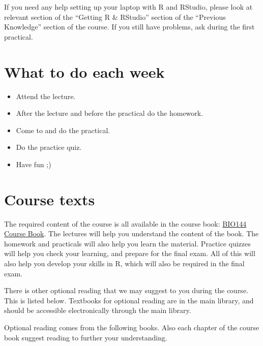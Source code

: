 \documentclass[
  letterpaper,
  8pt,
  a4paper]{book}
\begin{document}
If you need any help setting up your laptop with R and RStudio, please
look at relevant section of the ``Getting R \& RStudio'' section of the
``Previous Knowledge'' section of the course. If you still have
problems, ask during the first practical.

\section*{What to do each week}\label{what-to-do-each-week}


\begin{itemize}
\item
  Attend the lecture.
\item
  After the lecture and before the practical do the homework.
\item
  Come to and do the practical.
\item
  Do the practice quiz.
\item
  Have fun ;)
\end{itemize}

\section*{Course texts}\label{course-texts}


The required content of the course is all available in the course book:
\href{https://opetchey.github.io/BIO144_Course_Book/}{BIO144 Course
Book}. The lectures will help you understand the content of the book.
The homework and practicals will also help you learn the material.
Practice quizzes will help you check your learning, and prepare for the
final exam. All of this will also help you develop your skills in R,
which will also be required in the final exam.

There is other optional reading that we may suggest to you during the
course. This is listed below. Textbooks for optional reading are in the
main library, and should be accessible electronically through the main
library.

Optional reading comes from the following books. Also each chapter of
the course book suggest reading to further your understanding.
\end{document}

